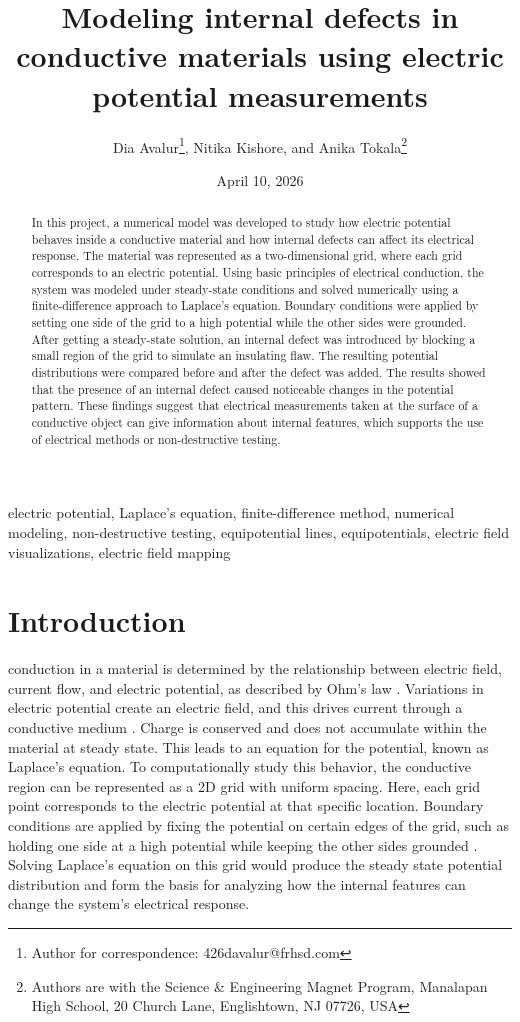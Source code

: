 \documentclass[10pt,journal,twoside]{IEEEtran} %
\title{Modeling internal defects in conductive materials using electric potential measurements} %
\author{Dia Avalur\thanks{Author for correspondence: 426davalur@frhsd.com}, Nitika Kishore, and Anika Tokala\thanks{Authors are with the Science \& Engineering Magnet Program, Manalapan High School, 20 Church Lane, Englishtown, NJ 07726, USA}} %
\date{April 10, 2026}
\newcommand{\keywords}{electric potential, Laplace's equation, finite-difference method, numerical modeling, non-destructive testing, equipotential lines, equipotentials, electric field visualizations, electric field mapping} %
\begin{document}
\maketitle

\begin{abstract}
In this project, a numerical model was developed to study how electric potential behaves inside a conductive material and how internal defects can affect its electrical response. The material was represented as a two-dimensional grid, where each grid corresponds to an electric potential. Using basic principles of electrical conduction, the system was modeled under steady-state conditions and solved numerically using a finite-difference approach to Laplace’s equation. Boundary conditions were applied by setting one side of the grid to a high potential while the other sides were grounded. After getting a steady-state solution, an internal defect was introduced by blocking a small region of the grid to simulate an insulating flaw. The resulting potential distributions were compared before and after the defect was added. The results showed that the presence of an internal defect caused noticeable changes in the potential pattern. These findings suggest that electrical measurements taken at the surface of a conductive object can give information about internal features, which supports the use of electrical methods or non-destructive testing. 
\end{abstract}

\begin{IEEEkeywords}
\keywords
\end{IEEEkeywords}

\section{Introduction}
 conduction in a material is determined by the relationship between electric field, current flow, and electric potential, as described by Ohm’s law \cite{knight:2017:physics}. Variations in electric potential create an electric field, and this drives current through a conductive medium \cite{jackson:1999:classical}. Charge is conserved and does not accumulate within the material at steady state. This leads to an equation for the potential, known as Laplace’s equation. To computationally study this behavior, the conductive region can be represented as a 2D grid with uniform spacing. Here, each grid point corresponds to the electric potential at that specific location. Boundary conditions are applied by fixing the potential on certain edges of the grid, such as holding one side at a high potential while keeping the other sides grounded \cite{jackson:1999:classical}. Solving Laplace’s equation on this grid would produce the steady state potential distribution and form the basis for analyzing how the internal features can change the system’s electrical response.
\end{document}
